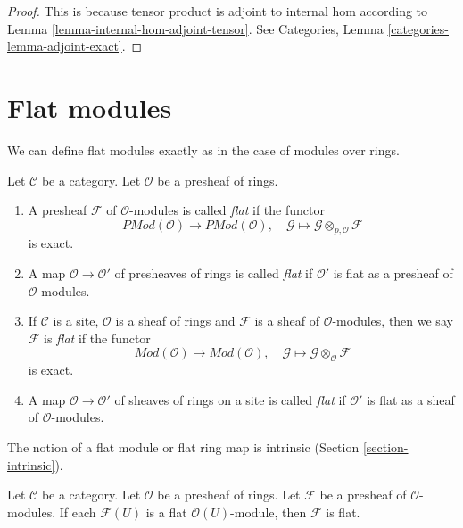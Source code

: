 \begin{proof}
This is because tensor product is adjoint to internal hom according
to Lemma \ref{lemma-internal-hom-adjoint-tensor}.
See Categories, Lemma \ref{categories-lemma-adjoint-exact}.
\end{proof}









\section{Flat modules}
\label{section-flat}

\noindent
We can define flat modules exactly as in the case of modules over rings.

\begin{definition}
\label{definition-flat}
Let $\mathcal{C}$ be a category.
Let $\mathcal{O}$ be a presheaf of rings.
\begin{enumerate}
\item A presheaf $\mathcal{F}$ of $\mathcal{O}$-modules is called
{\it flat} if the functor
$$
\textit{PMod}(\mathcal{O})
\longrightarrow
\textit{PMod}(\mathcal{O}), \quad
\mathcal{G} \mapsto \mathcal{G} \otimes_{p, \mathcal{O}} \mathcal{F}
$$
is exact.
\item A map $\mathcal{O} \to \mathcal{O}'$ of presheaves of rings
is called {\it flat} if $\mathcal{O}'$ is flat as a presheaf of
$\mathcal{O}$-modules.
\item If $\mathcal{C}$ is a site, $\mathcal{O}$ is a sheaf of rings
and $\mathcal{F}$ is a sheaf of $\mathcal{O}$-modules, then we
say $\mathcal{F}$ is {\it flat} if the functor
$$
\textit{Mod}(\mathcal{O})
\longrightarrow
\textit{Mod}(\mathcal{O}), \quad
\mathcal{G} \mapsto \mathcal{G} \otimes_{\mathcal{O}} \mathcal{F}
$$
is exact.
\item A map $\mathcal{O} \to \mathcal{O}'$ of sheaves of rings on a site
is called {\it flat} if $\mathcal{O}'$ is flat as a sheaf of
$\mathcal{O}$-modules.
\end{enumerate}
\end{definition}

\noindent
The notion of a flat module or flat ring map is intrinsic
(Section \ref{section-intrinsic}).

\begin{lemma}
\label{lemma-flatness-presheaves}
Let $\mathcal{C}$ be a category.
Let $\mathcal{O}$ be a presheaf of rings.
Let $\mathcal{F}$ be a presheaf of $\mathcal{O}$-modules.
If each $\mathcal{F}(U)$ is a flat $\mathcal{O}(U)$-module,
then $\mathcal{F}$ is flat.
\end{lemma}

